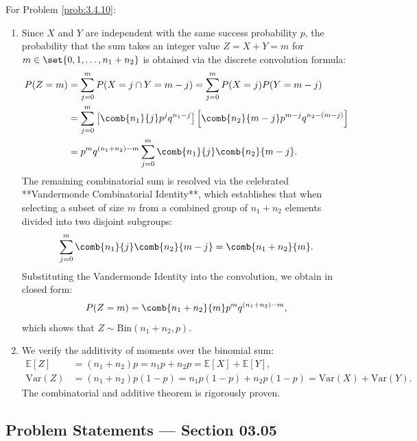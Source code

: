 \begin{solucion}
	\label{sol:3.4.10}
	For Problem \ref{prob:3.4.10}:
	\begin{enumerate}
		\item Since $X$ and $Y$ are independent with the same success probability $p$, the probability that the sum takes an integer value $Z = X+Y = m$ for $m \in \set{0, 1, \dots, n_1+n_2}$ is obtained via the discrete convolution formula:
		\begin{align*}
			P(Z = m) &= \sum_{j=0}^m P(X = j \cap Y = m-j) = \sum_{j=0}^m P(X = j)P(Y = m-j) \\
			&= \sum_{j=0}^m \left[ \comb{n_1}{j} p^j q^{n_1-j} \right] \left[ \comb{n_2}{m-j} p^{m-j} q^{n_2-(m-j)} \right] \\
			&= p^m q^{(n_1+n_2)-m} \sum_{j=0}^m \comb{n_1}{j} \comb{n_2}{m-j}.
		\end{align*}
		The remaining combinatorial sum is resolved via the celebrated **Vandermonde Combinatorial Identity**, which establishes that when selecting a subset of size $m$ from a combined group of $n_1 + n_2$ elements divided into two disjoint subgroups:
		\begin{align*}
			\sum_{j=0}^m \comb{n_1}{j} \comb{n_2}{m-j} = \comb{n_1+n_2}{m}.
		\end{align*}
		Substituting the Vandermonde Identity into the convolution, we obtain in closed form:
		\begin{align*}
			P(Z = m) = \comb{n_1+n_2}{m} p^m q^{(n_1+n_2)-m},
		\end{align*}
		which shows that $Z \sim \text{Bin}(n_1+n_2, p)$.
		\item We verify the additivity of moments over the binomial sum:
		\begin{align*}
			\mathbb{E}[Z] &= (n_1 + n_2)p = n_1 p + n_2 p = \mathbb{E}[X] + \mathbb{E}[Y], \\
			\text{Var}(Z) &= (n_1 + n_2)p(1-p) = n_1 p(1-p) + n_2 p(1-p) = \text{Var}(X) + \text{Var}(Y).
		\end{align*}
		The combinatorial and additive theorem is rigorously proven.
	\end{enumerate}
\end{solucion}


\subsection*{Problem Statements --- Section 03.05}

